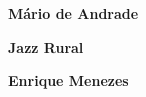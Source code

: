 \textbf{Mário de Andrade} \lipsum[1]

\textbf{Jazz Rural} \lipsum[1]
        
\textbf{Enrique Menezes} \lipsum[1]

